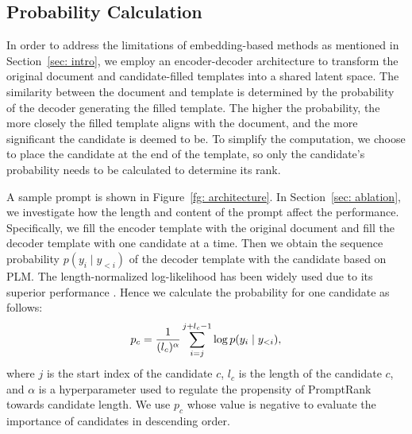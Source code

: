 \documentclass[11pt]{article}
\begin{document}
\subsection{Probability Calculation} 

In order to address the limitations of embedding-based methods as mentioned in Section~\ref{sec: intro}, we employ an encoder-decoder architecture to transform the original document and candidate-filled templates into a shared latent space. The similarity between the document and template is determined by the probability of the decoder generating the filled template. The higher the probability, the more closely the filled template aligns with the document, and the more significant the candidate is deemed to be. To simplify the computation, we choose to place the candidate at the end of the template, so only the candidate's probability needs to be calculated to determine its rank.


A sample prompt is shown in Figure~\ref{fg: architecture}. In Section~\ref{sec: ablation}, we investigate how the length and content of the prompt affect the performance. Specifically, we fill the encoder template with the original document and fill the decoder template with one candidate at a time. Then we obtain the sequence probability $p(y_{i}\mid y_{<i})$ of the decoder template with the candidate based on PLM.
The length-normalized log-likelihood has been widely used due to its superior performance \cite{mao-etal-2019-improving, NEURIPS2020_1457c0d6, oluwatobi-mueller-2020-dlgnet}. Hence we calculate the probability for one candidate as follows: \begin{equation} 
\setlength{\abovedisplayskip}{3pt}
\setlength{\belowdisplayskip}{3pt}    
p_{c}=\frac{1}{({l}_{c})^{\alpha}}\sum_{i={j}}^{{j+l_{c}-1}} \log p(y_{i} \mid y_{<i}),
\label{log_p}
\end{equation} 
where $j$ is the start index of the candidate $c$, $l_{c}$ is the length of the candidate $c$, and $\alpha$ is a hyperparameter used to regulate the propensity of PromptRank towards candidate length. We use $p_{c}$ whose value is negative to evaluate the importance of candidates in descending order. 
\end{document}
